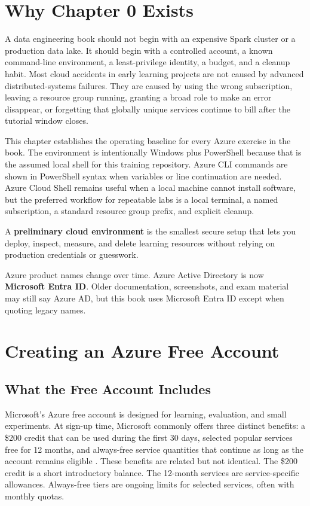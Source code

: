 \section{Why Chapter 0 Exists}
A data engineering book should not begin with an expensive Spark cluster or a production data lake. It should begin with a controlled account, a known command-line environment, a least-privilege identity, a budget, and a cleanup habit. Most cloud accidents in early learning projects are not caused by advanced distributed-systems failures. They are caused by using the wrong subscription, leaving a resource group running, granting a broad role to make an error disappear, or forgetting that globally unique services continue to bill after the tutorial window closes.

This chapter establishes the operating baseline for every Azure exercise in the book. The environment is intentionally Windows plus PowerShell because that is the assumed local shell for this training repository. Azure CLI commands are shown in PowerShell syntax when variables or line continuation are needed. Azure Cloud Shell remains useful when a local machine cannot install software, but the preferred workflow for repeatable labs is a local terminal, a named subscription, a standard resource group prefix, and explicit cleanup.

\begin{definitionbox}
A \textbf{preliminary cloud environment} is the smallest secure setup that lets you deploy, inspect, measure, and delete learning resources without relying on production credentials or guesswork.
\end{definitionbox}

\begin{notebox}
Azure product names change over time. Azure Active Directory is now \textbf{Microsoft Entra ID}. Older documentation, screenshots, and exam material may still say Azure AD, but this book uses Microsoft Entra ID except when quoting legacy names.
\end{notebox}

\section{Creating an Azure Free Account}

\subsection{What the Free Account Includes}
Microsoft's Azure free account is designed for learning, evaluation, and small experiments. At sign-up time, Microsoft commonly offers three distinct benefits: a \$200 credit that can be used during the first 30 days, selected popular services free for 12 months, and always-free service quantities that continue as long as the account remains eligible \cite{microsoft2025azureFreeAccount}. These benefits are related but not identical. The \$200 credit is a short introductory balance. The 12-month services are service-specific allowances. Always-free tiers are ongoing limits for selected services, often with monthly quotas.

